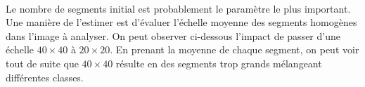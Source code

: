 \documentclass[11pt]{article}
\begin{document}
    \begin{center}
    \end{center}
    { \hspace*{\fill} \\}
    
    Le nombre de segments initial est probablement le paramètre le plus
important. Une manière de l'estimer est d'évaluer l'échelle moyenne des
segments homogènes dans l'image à analyser. On peut observer ci-dessous
l'impact de passer d'une échelle \(40 \times 40\) à \(20 \times 20\). En
prenant la moyenne de chaque segment, on peut voir tout de suite que
\(40 \times 40\) résulte en des segments trop grands mélangeant
différentes classes.
\end{document}

